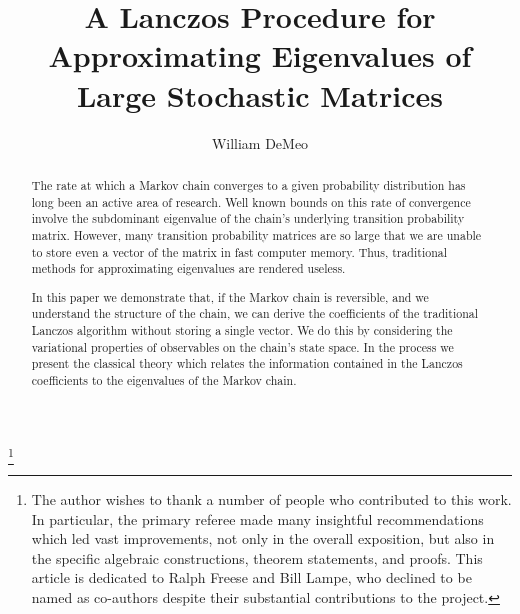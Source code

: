 \documentclass{au}
\numberwithin{equation}{section}
\theoremstyle{plain}
\theoremstyle{definition}
\newcommand{\<}{\ensuremath{\langle}}
\renewcommand{\>}{\ensuremath{\rangle}}
\begin{document}

\title[Approximating Eigenvalues of Large Stochastic Matrices]{A Lanczos Procedure for Approximating Eigenvalues of Large Stochastic Matrices}

\author{William DeMeo}
\address{Department of Mathematics\\
University of South Carolina\\Columbia 29208\\USA}

\thanks{The author wishes to thank a number of people who contributed to this
  work.  In particular, the primary referee made many insightful recommendations
  which led vast improvements, not only in the overall exposition, but also in
  the specific algebraic constructions, theorem statements, and proofs.
  This article is dedicated to Ralph Freese and Bill Lampe, who declined to be
  named as co-authors despite their substantial contributions to the project.}  







\begin{abstract}
The rate at which a Markov chain converges to a given probability distribution
has long been an active area of research. Well known bounds on this rate of
convergence involve the subdominant eigenvalue of the chain’s underlying
transition probability matrix. However, many transition probability matrices are
so large that we are unable to store even a vector of the matrix in fast
computer memory. Thus, traditional methods for approximating eigenvalues are
rendered useless.  

In this paper we demonstrate that, if the Markov chain is reversible, and we
understand the structure of the chain, we can derive the coefficients of the
traditional Lanczos algorithm without storing a single vector. We do this by
considering the variational properties of observables on the chain’s state
space. In the process we present the classical theory which relates the
information contained in the Lanczos coefficients to the eigenvalues of the
Markov chain. 
\end{abstract}
\end{document}
